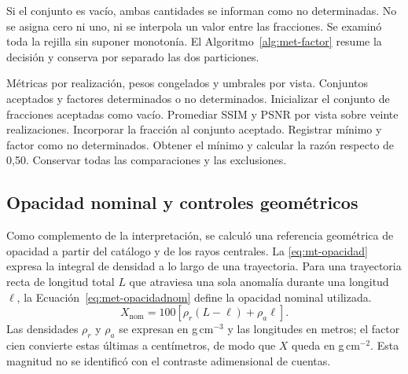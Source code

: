 Si el conjunto es vacío, ambas cantidades se informan como no determinadas. No se asigna cero ni uno, ni se interpola un valor entre las fracciones. Se examinó toda la rejilla sin suponer monotonía. El Algoritmo~\ref{alg:met-factor} resume la decisión y conserva por separado las dos particiones.
\begin{algorithm}[htbp]\small
\caption{Evaluación de la fracción mínima en la rejilla disponible.}\label{alg:met-factor}
\begin{algorithmic}[1]
\Require Métricas por realización, pesos congelados y umbrales por vista.
\Ensure Conjuntos aceptados y factores determinados o no determinados.
\State Inicializar el conjunto de fracciones aceptadas como vacío.
\State Promediar SSIM y PSNR por vista sobre veinte realizaciones.
\State Incorporar la fracción al conjunto aceptado.
\EndIf
\EndFor
{}
\State Registrar mínimo y factor como no determinados.
\Else
\State Obtener el mínimo y calcular la razón respecto de 0,50.
\EndIf
\State Conservar todas las comparaciones y las exclusiones.
\EndFor
\end{algorithmic}\end{algorithm}

\subsection{Opacidad nominal y controles geométricos}\label{sec:met-opacidad}
Como complemento de la interpretación, se calculó una referencia geométrica de opacidad a partir del catálogo y de los rayos centrales. La \cref{eq:mt-opacidad} expresa la integral de densidad a lo largo de una trayectoria. Para una trayectoria recta de longitud total $L$ que atraviesa una sola anomalía durante una longitud $\ell$, la Ecuación~\eqref{eq:met-opacidadnom} define la opacidad nominal utilizada.
\begin{equation}X_{\mathrm{nom}}=100\left[\rho_r(L-\ell)+\rho_a\ell\right].\label{eq:met-opacidadnom}\end{equation}
Las densidades $\rho_r$ y $\rho_a$ se expresan en g\,cm$^{-3}$ y las longitudes en metros; el factor cien convierte estas últimas a centímetros, de modo que $X$ queda en g\,cm$^{-2}$. Esta magnitud no se identificó con el contraste adimensional de cuentas.

